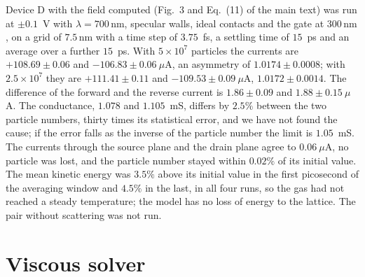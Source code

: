 \documentclass[aps,prapplied,onecolumn,superscriptaddress,floatfix]{revtex4-2}
\newcommand{\nm}{\,\mathrm{nm}}
\begin{document}
Device D with the field computed (Fig.~3 and Eq.~(11) of the main text)
was run at $\pm0.1$~V with $\lambda=700\nm$, specular walls, ideal
contacts and the gate at $300\nm$, on a grid of $7.5\nm$ with a time
step of $3.75$~fs, a settling time of $15$~ps and an average over a
further $15$~ps. With $5\times10^{7}$ particles the currents are
$+108.69\pm0.06$ and $-106.83\pm0.06\ \mu$A, an asymmetry of
$1.0174\pm0.0008$; with $2.5\times10^{7}$ they are $+111.41\pm0.11$ and
$-109.53\pm0.09\ \mu$A, $1.0172\pm0.0014$. The difference of the forward
and the reverse current is $1.86\pm0.09$ and $1.88\pm0.15\ \mu$A. The
conductance, $1.078$ and $1.105$~mS, differs by $2.5\%$ between the two
particle numbers, thirty times its statistical error, and we have not
found the cause; if the error falls as the inverse of the particle
number the limit is $1.05$~mS. The currents through the source plane
and the drain plane agree to $0.06\ \mu$A, no particle was lost, and
the particle number stayed within $0.02\%$ of its initial value. The
mean kinetic energy was $3.5\%$ above its initial value in the first
picosecond of the averaging window and $4.5\%$ in the last, in all four
runs, so the gas had not reached a steady temperature; the model has no
loss of energy to the lattice. The pair without scattering was not run.

\section{Viscous solver}
\end{document}
